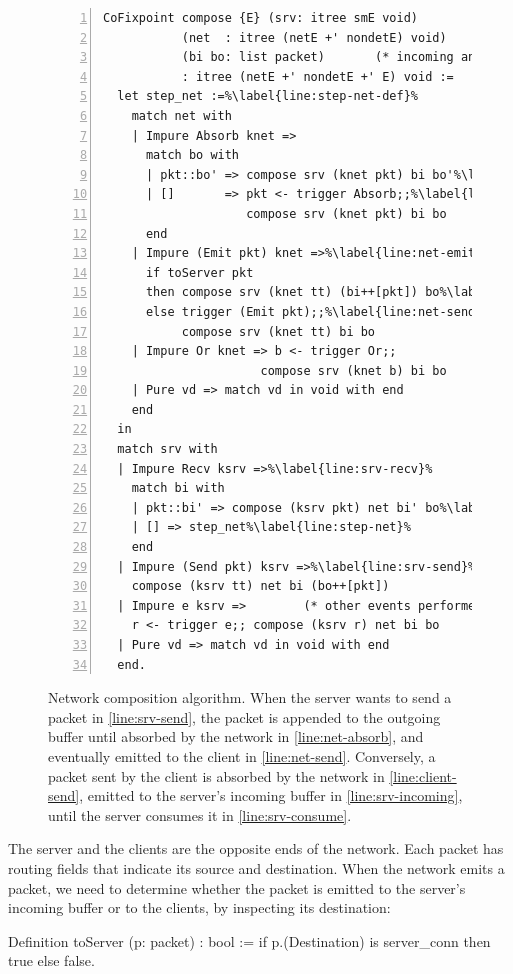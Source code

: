 \begin{figure}
\begin{lstlisting}[numbers=left]
CoFixpoint compose {E} (srv: itree smE void)          (* server  model *)
           (net  : itree (netE +' nondetE) void)      (* network model *)
           (bi bo: list packet)       (* incoming and outgoing buffers *)
           : itree (netE +' nondetE +' E) void :=
  let step_net :=%\label{line:step-net-def}%
    match net with
    | Impure Absorb knet =>
      match bo with
      | pkt::bo' => compose srv (knet pkt) bi bo'%\label{line:net-absorb}%
      | []       => pkt <- trigger Absorb;;%\label{line:client-send}%
                    compose srv (knet pkt) bi bo
      end
    | Impure (Emit pkt) knet =>%\label{line:net-emit}%
      if toServer pkt
      then compose srv (knet tt) (bi++[pkt]) bo%\label{line:srv-incoming}%
      else trigger (Emit pkt);;%\label{line:net-send}%
           compose srv (knet tt) bi bo
    | Impure Or knet => b <- trigger Or;;
                      compose srv (knet b) bi bo
    | Pure vd => match vd in void with end
    end
  in
  match srv with
  | Impure Recv ksrv =>%\label{line:srv-recv}%
    match bi with
    | pkt::bi' => compose (ksrv pkt) net bi' bo%\label{line:srv-consume}%
    | [] => step_net%\label{line:step-net}%
    end
  | Impure (Send pkt) ksrv =>%\label{line:srv-send}%
    compose (ksrv tt) net bi (bo++[pkt])
  | Impure e ksrv =>        (* other events performed by the server *)
    r <- trigger e;; compose (ksrv r) net bi bo
  | Pure vd => match vd in void with end
  end.
\end{lstlisting}
\vspace*{1em}
\caption[Network composition algorithm]{Network composition algorithm.  When the
  server wants to send a packet in \autoref{line:srv-send}, the packet is
  appended to the outgoing buffer until absorbed by the network
  in \autoref{line:net-absorb}, and eventually emitted to the client
  in \autoref{line:net-send}.  Conversely, a packet sent by the client is
  absorbed by the network in \autoref{line:client-send}, emitted to the server's
  incoming buffer in \autoref{line:srv-incoming}, until the server consumes it
  in \autoref{line:srv-consume}.}
\label{fig:net-compose-code}
\end{figure}

The server and the clients are the opposite ends of the network.  Each packet
has routing fields that indicate its source and destination.  When the network
emits a packet, we need to determine whether the packet is emitted to the
server's incoming buffer or to the clients, by inspecting its destination:
\begin{coq}
  Definition toServer (p: packet) : bool :=
    if p.(Destination) is server_conn then true else false.
\end{coq}

